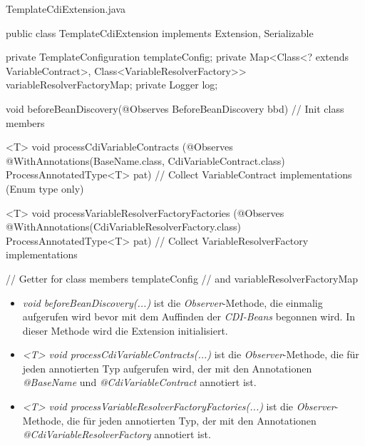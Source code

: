 \begin{program}[h]
\caption{TemplateCdiExtension.java}
\label{prog:templateCdiExtension}
\begin{JavaCode}
public class TemplateCdiExtension implements Extension,
        Serializable {

    private TemplateConfiguration templateConfig;
    private Map<Class<? extends VariableContract>, 
                Class<VariableResolverFactory>>  
            variableResolverFactoryMap;
    private Logger log;

    void beforeBeanDiscovery(@Observes BeforeBeanDiscovery bbd) {
        // Init class members
    }

    <T> void processCdiVariableContracts
             (@Observes @WithAnnotations({BaseName.class, 
                                          CdiVariableContract.class}) 
             ProcessAnnotatedType<T> pat) {
       // Collect VariableContract implementations (Enum type only)
    }

    <T> void processVariableResolverFactoryFactories
        (@Observes @WithAnnotations(CdiVariableResolverFactory.class) 
        ProcessAnnotatedType<T> pat) {
        // Collect VariableResolverFactory implementations
    }

    // Getter for class members templateConfig
    // and variableResolverFactoryMap
}
\end{JavaCode}
\end{program}
\begin{itemize}
	\item\emph{void beforeBeanDiscovery(...)} 
	\newline
	ist die \emph{Observer}-Methode, die einmalig aufgerufen wird bevor mit dem Auffinden der \emph{CDI-Beans} begonnen wird. In dieser Methode wird die Extension initialisiert.
	\item\emph{<T> void processCdiVariableContracts(...)} 
	\newline
	ist die \emph{Observer}-Methode, die für jeden annotierten Typ aufgerufen wird, der mit den Annotationen \emph{@BaseName} und \emph{@CdiVariableContract} annotiert ist.
	\item\emph{<T> void processVariableResolverFactoryFactories(...)} 
	\newline
	ist die \emph{Observer}-Methode, die für jeden annotierten Typ, der mit den Annotationen \emph{@CdiVariableResolverFactory} annotiert ist.
\end{itemize}
\ \newpage

